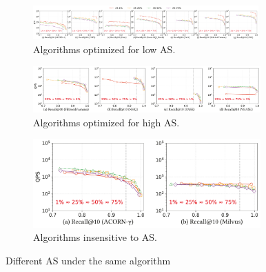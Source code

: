 \documentclass[sigconf, nonacm]{acmart}
\begin{document}
	
	\begin{figure}
		\centering
		
		\begin{subfigure}{\textwidth}
			\centering
			
			\includegraphics[width=0.95\textwidth]{figures/exp/exp_5_2_1.pdf}
			\caption{Algorithms optimized for low AS.}
			\label{fig:exp_5_2_1}
		\end{subfigure}
		
		\vfill %
		
		\begin{subfigure}{0.627\textwidth} %
			\centering
			
			\includegraphics[width=0.96\textwidth]{figures/exp/exp_5_2_2.pdf}
			\caption{Algorithms optimized for high AS.}
			\label{fig:exp_5_2_2}
		\end{subfigure}
		\hspace{1mm} %
		\begin{subfigure}{0.33\textwidth} %
			\centering
			
			\includegraphics[width=0.96\textwidth]{figures/exp/exp_5_2_3.pdf}
			\caption{Algorithms insensitive to AS.}
			\label{fig:exp_5_2_3}
		\end{subfigure}
		
		
		\caption{Different AS under the same algorithm}
		\label{fig:exp_5_2_combined}
	\end{figure}
	
\end{document}
